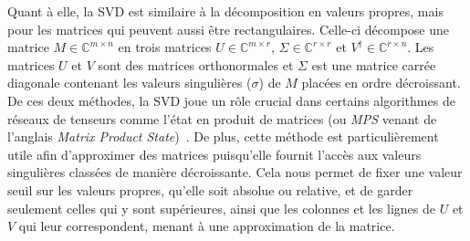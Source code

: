 Quant à elle, la SVD est similaire à la décomposition en valeurs propres, mais pour les matrices qui peuvent aussi être rectangulaires.
Celle-ci décompose une matrice $M \in \mathbb{C}^{m \times n}$ en trois matrices $U \in \mathbb{C}^{m \times r}$, $\Sigma \in \mathbb{C}^{r \times r}$ et $V^\dagger \in \mathbb{C}^{r \times n}$.
Les matrices $U$ et $V$ sont des matrices orthonormales et $\Sigma$ est une matrice carrée diagonale contenant les valeurs singulières ($\sigma$) de $M$ placées en ordre décroissant.
De ces deux méthodes, la SVD joue un rôle crucial dans certains algorithmes de réseaux de tenseurs comme l'état en produit de matrices (ou \textit{MPS} venant de l'anglais \textit{Matrix Product State})~\cite{hauschild2018efficient}.
De plus, cette méthode est particulièrement utile afin d'approximer des matrices puisqu'elle fournit l'accès aux valeurs singulières classées de manière décroissante.
Cela nous permet de fixer une valeur seuil sur les valeurs propres, qu'elle soit absolue ou relative, et de garder seulement celles qui y sont supérieures, ainsi que les colonnes et les lignes de $U$ et $V$ qui leur correspondent, menant à une approximation de la matrice.

